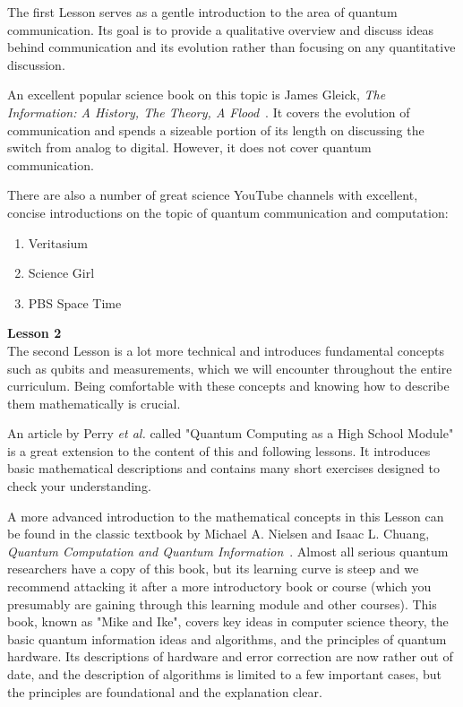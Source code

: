 The first Lesson serves as a gentle introduction to the area of quantum communication. Its goal is to provide a qualitative overview and discuss ideas behind communication and its evolution rather than focusing on any quantitative discussion.

An excellent popular science book on this topic is James Gleick, \emph{The Information: A History, The Theory, A Flood}~\cite{gleick2012information}. It covers the evolution of communication and spends a sizeable portion of its length on discussing the switch from analog to digital. However, it does not cover quantum communication.

There are also a number of great science YouTube channels with excellent, concise introductions on the topic of quantum communication and computation:
\begin{enumerate}
    \item Veritasium
    \item Science Girl
    \item PBS Space Time
\end{enumerate}

{\bf Lesson 2}\\

The second Lesson is a lot more technical and introduces fundamental concepts such as qubits and measurements, which we will encounter throughout the entire curriculum. Being comfortable with these concepts and knowing how to describe them mathematically is crucial.

An article by Perry \emph{et al.} called "Quantum Computing as a High School Module" is a great extension to the content of this and following lessons. It introduces basic mathematical descriptions and contains many short exercises designed to check your understanding.

A more advanced introduction to the mathematical concepts in this Lesson can be found in the classic textbook by Michael A. Nielsen and Isaac L. Chuang, \emph{Quantum Computation and Quantum Information}~\cite{nielsen-chuang:qci}. Almost all serious quantum researchers have a copy of this book, but its learning curve is steep and we recommend attacking it after a more introductory book or course (which you presumably are gaining through this learning module and other courses). This book, known as "Mike and Ike", covers key ideas in computer science theory, the basic quantum information ideas and algorithms, and the principles of quantum hardware. Its descriptions of hardware and error correction are now rather out of date, and the description of algorithms is limited to a few important cases, but the principles are foundational and the explanation clear.

